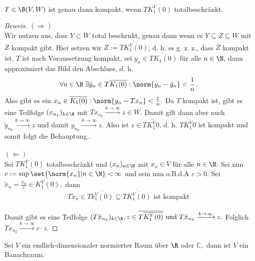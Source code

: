 \begin{theorem} \label{kmp_gdw_tot} $T \in \B(V, W)$ ist genau dann kompakt, wenn $T\overline{K_1^V(0)}$ totalbeschränkt. 
	
	
	\begin{proof}[Beweis] $(\Rightarrow)$ \\
		Wir nutzen aus, dass  \(Y\subset W\) total beschr\as nkt, genau dann wenn es \(Y\subseteq Z\subseteq W\) mit $Z$ kompakt gibt. Hier setzen wir \(Z := \overline{T\overline{K_1^V(0)}}\), d. h. es g. z. z., dass $Z$ kompakt ist. $T$ ist nach Voraussetzung kompakt, sei $y_n \in \overline{T\overline{K_1(0)}}$ für alle $n \in \N,$ dann approximiert das Bild den Abschluss, d. h. \[\forall n\in \N \;\exists \tilde y_n \in T\overline{K_1(0)}: \norm{y_n - \tilde y_n} < \frac{1}{n}.\] Also gibt es ein $x_n \in \overline{K_1(0)}: \norm{y_n -Tx_n} < \frac{1}{n}.$ Da $T$ kompakt ist, gibt es eine Teilfolge $(x_{n_k})_{k \in \N}$ mit $Tx_{n_k} \xrightarrow{k \to \infty} z\in W.$ Damit gilt dann aber auch $\tilde y_{n_k} \xrightarrow{k \to \infty} z$ und damit $y_{n_k} \xrightarrow{k \to \infty} z.$ Also ist $z \in \overline{T\overline{K^V_1{0}}}$, d. h. $\overline{T\overline{K^V_1{0}}}$ ist kompakt und somit folgt die Behauptung.. \\ \\
		$(\Leftarrow)$ \\
		Sei $T\overline{K_1^V(0)}$ totalbeschränkt und $(x_n)_{n \in \N}$ mit $x_n \in V $ für alle $n \in \N.$ Sei nun $c := \sup{\set{\norm{x_n}| n \in \N}} < \infty$ und sein nun o.B.d.A $c > 0.$ Sei $\tilde x_n = \frac{x_n}{c} \in \overline{K_1^V(0)},$ dann \[T\tilde x_n \in T\overline{k_1^V(0)} \subseteq \overline{T\overline{K_1^V(0)}} \text{ ist kompakt}\] \\
		Damit gibt es eine Teilfolge $(T \tilde x_{n_k})_{k \in \N}, z \in \overline{T\overline{K_1^V(0)}} \text{ und } T\tilde x_{n_k} \xrightarrow{k \to \infty} z.$ Folglich $Tx_{n_k} \xrightarrow{k \to \infty} c \cdot z.$
		
	\end{proof}
	
\end{theorem}


\begin{rem} Sei $V$ ein endlich-dimensionaler normierter Raum über $\R$ oder $\mathbb{C},$ dann ist $V$ ein Banachraum. 
	
\end{rem}


